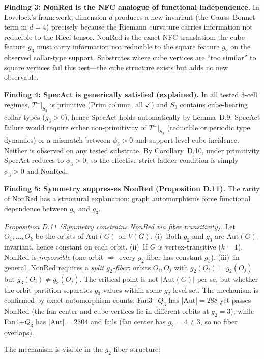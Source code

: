\documentclass[11pt,a4paper]{article}
\theoremstyle{definition}
\theoremstyle{remark}
\begin{document}
\textbf{Finding 3: NonRed is the NFC analogue of functional independence.} In Lovelock's framework, dimension $d$ produces a new invariant (the Gauss--Bonnet term in $d = 4$) precisely because the Riemann curvature carries information not reducible to the Ricci tensor. NonRed is the exact NFC translation: the cube feature $g_3$ must carry information not reducible to the square feature $g_2$ on the observed collar-type support. Substrates where cube vertices are ``too similar'' to square vertices fail this test---the cube structure exists but adds no new observable.

\textbf{Finding 4: SpecAct is generically satisfied (explained).} In all tested 3-cell regimes, $T^\perp|_{S_3}$ is primitive (Prim column, all $\checkmark$) and $S_3$ contains cube-bearing collar types ($g_3 > 0$), hence SpecAct holds automatically by Lemma~D.9. SpecAct failure would require either non-primitivity of $T^\perp|_{S_3}$ (reducible or periodic type dynamics) or a mismatch between $\phi_3 > 0$ and support-level cube incidence. Neither is observed on any tested substrate. By Corollary~D.10, under primitivity SpecAct reduces to $\phi_3 > 0$, so the effective strict ladder condition is simply $\phi_3 > 0$ and NonRed.

\textbf{Finding 5: Symmetry suppresses NonRed (Proposition D.11).}
The rarity of NonRed has a structural explanation: graph automorphisms force functional dependence between $g_2$ and $g_3$.

\emph{Proposition D.11 (Symmetry constrains NonRed via fiber transitivity).}
Let $O_1,\ldots,O_k$ be the orbits of $\mathrm{Aut}(G)$ on $V(G)$.
(i)~Both $g_2$ and $g_3$ are $\mathrm{Aut}(G)$-invariant, hence constant on each orbit.
(ii)~If $G$ is vertex-transitive ($k=1$), NonRed is \emph{impossible} (one orbit $\Rightarrow$ every $g_2$-fiber has constant $g_3$).
(iii)~In general, NonRed requires a \emph{split $g_2$-fiber}: orbits $O_i, O_j$ with $g_2(O_i) = g_2(O_j)$ but $g_3(O_i) \neq g_3(O_j)$.
The critical point is not $|\mathrm{Aut}(G)|$ per se, but whether the orbit partition separates $g_3$ values within some $g_2$-level set. The mechanism is confirmed by exact automorphism counts: Fan3+$Q_3$ has $|\mathrm{Aut}| = 288$ yet passes NonRed (the fan center and cube vertices lie in different orbits at $g_2 = 3$), while Fan4+$Q_3$ has $|\mathrm{Aut}| = 2304$ and fails (fan center has $g_2 = 4 \neq 3$, so no fiber overlaps).

The mechanism is visible in the $g_2$-fiber structure:
\end{document}
